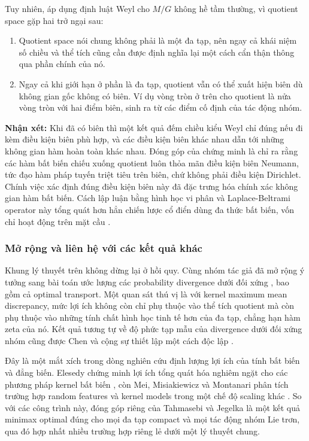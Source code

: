Tuy nhiên, áp dụng định luật Weyl cho $M/G$ không hề tầm thường, vì quotient space gặp hai trở ngại sau:
\begin{enumerate}
    \item Quotient space nói chung không phải là một đa tạp, nên ngay cả khái niệm số chiều và thể tích cũng cần được định nghĩa lại một cách cẩn thận thông qua phần chính của nó.
    \item Ngay cả khi giới hạn ở phần là đa tạp, quotient vẫn có thể xuất hiện biên dù không gian gốc không có biên. Ví dụ vòng tròn ở trên cho quotient là nửa vòng tròn với hai điểm biên, sinh ra từ các điểm cố định của tác động nhóm.
\end{enumerate}
 
\textbf{Nhận xét:} Khi đã có biên thì một kết quả đếm chiều kiểu Weyl chỉ đúng nếu đi kèm điều kiện biên phù hợp, và các điều kiện biên khác nhau dẫn tới những không gian hàm hoàn toàn khác nhau. Đóng góp của chứng minh là chỉ ra rằng các hàm bất biến chiếu xuống quotient luôn thỏa mãn điều kiện biên Neumann, tức đạo hàm pháp tuyến triệt tiêu trên biên, chứ không phải điều kiện Dirichlet. Chính việc xác định đúng điều kiện biên này đã đặc trưng hóa chính xác không gian hàm bất biến. Cách lập luận bằng hình học vi phân và Laplace-Beltrami operator này tổng quát hơn hẳn chiến lược cổ điển dùng đa thức bất biến, vốn chỉ hoạt động trên mặt cầu \cite{bietti2021sample}.
 
\subsubsection{Mở rộng và liên hệ với các kết quả khác}
 
Khung lý thuyết trên không dừng lại ở hồi quy. Cùng nhóm tác giả đã mở rộng ý tưởng sang bài toán ước lượng các probability divergence dưới đối xứng \cite{tahmasebi2024divergences}, bao gồm cả optimal transport. Một quan sát thú vị là với kernel maximum mean discrepancy, mức lợi ích không còn chỉ phụ thuộc vào thể tích quotient mà còn phụ thuộc vào những tính chất hình học tinh tế hơn của đa tạp, chẳng hạn hàm zeta của nó. Kết quả tương tự về độ phức tạp mẫu của divergence dưới đối xứng nhóm cũng được Chen và cộng sự thiết lập một cách độc lập \cite{chen2023sample}.
 
Đây là một mắt xích trong dòng nghiên cứu định lượng lợi ích của tính bất biến và đẳng biến. Elesedy chứng minh lợi ích tổng quát hóa nghiêm ngặt cho các phương pháp kernel bất biến \cite{elesedy2021kernel}, còn Mei, Misiakiewicz và Montanari phân tích trường hợp random features và kernel models trong một chế độ scaling khác \cite{mei2021learning}. So với các công trình này, đóng góp riêng của Tahmasebi và Jegelka là một kết quả minimax optimal đúng cho mọi đa tạp compact và mọi tác động nhóm Lie trơn, qua đó hợp nhất nhiều trường hợp riêng lẻ dưới một lý thuyết chung.
 
